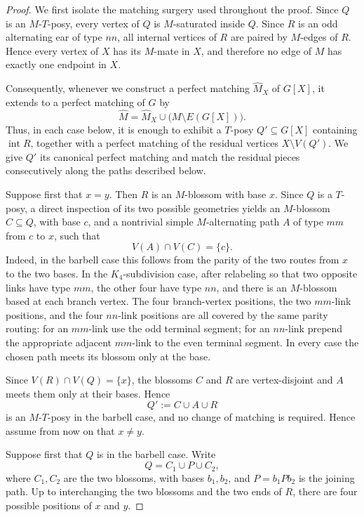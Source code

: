 \documentclass[10pt,a4paper]{amsart}
\begin{document}
\begin{proof}
We first isolate the matching surgery used throughout the proof.
Since \(Q\) is an \(M\)-\(T\)-posy, every vertex of \(Q\) is
\(M\)-saturated inside \(Q\). Since \(R\) is an odd alternating ear of
type \(nn\), all internal vertices of \(R\) are paired by \(M\)-edges
of \(R\). Hence every vertex of \(X\) has its \(M\)-mate in \(X\), and
therefore no edge of \(M\) has exactly one endpoint in \(X\).

Consequently, whenever we construct a perfect matching
\(\widehat M_X\) of \(G[X]\), it extends to a perfect matching of \(G\)
by
\[
\widehat M
=
\widehat M_X
\cup
\bigl(M\setminus E(G[X])\bigr).
\]
Thus, in each case below, it is enough to exhibit a \(T\)-posy
\(Q'\subseteq G[X]\) containing \(\operatorname{int}R\), together with
a perfect matching of the residual vertices \(X\setminus V(Q')\).
We give \(Q'\) its canonical perfect matching and match the residual
pieces consecutively along the paths described below.

Suppose first that \(x=y\). Then \(R\) is an \(M\)-blossom with base
\(x\). Since \(Q\) is a \(T\)-posy, a direct inspection of its two
possible geometries yields an \(M\)-blossom \(C\subseteq Q\), with base
\(c\), and a nontrivial simple \(M\)-alternating path \(A\) of type
\(mm\) from \(c\) to \(x\), such that
\[
V(A)\cap V(C)=\{c\}.
\]
Indeed, in the barbell case this follows from the parity of the two
routes from \(x\) to the two bases. In the \(K_4\)-subdivision case,
after relabeling so that two opposite links have type \(mm\), the other
four have type \(nn\), and there is an \(M\)-blossom based at each
branch vertex. The four branch-vertex positions, the two \(mm\)-link
positions, and the four \(nn\)-link positions are all covered by the
same parity routing: for an \(mm\)-link use the odd terminal segment;
for an \(nn\)-link prepend the appropriate adjacent \(mm\)-link to the
even terminal segment. In every case the chosen path meets its blossom
only at the base.

Since \(V(R)\cap V(Q)=\{x\}\), the blossoms \(C\) and \(R\) are
vertex-disjoint and \(A\) meets them only at their bases. Hence
\[
Q':=C\cup A\cup R
\]
is an \(M\)-\(T\)-posy in the barbell case, and no change of matching
is required. Hence assume from now on that \(x\neq y\).

Suppose first that \(Q\) is in the barbell case. Write
\[
Q=C_1\cup P\cup C_2,
\]
where \(C_1,C_2\) are the two blossoms, with bases \(b_1,b_2\), and
\(P=b_1Pb_2\) is the joining path. Up to interchanging the two blossoms
and the two ends of \(R\), there are four possible positions of
\(x\) and \(y\).


\end{proof}
\end{document}
